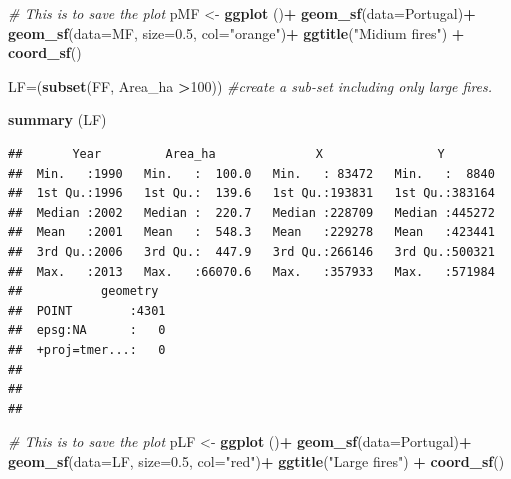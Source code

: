 \documentclass[
]{article}
\newenvironment{Shaded}{\begin{snugshade}}{\end{snugshade}}
\newcommand{\AttributeTok}[1]{\textcolor[rgb]{0.13,0.29,0.53}{#1}}
\newcommand{\CommentTok}[1]{\textcolor[rgb]{0.56,0.35,0.01}{\textit{#1}}}
\newcommand{\DecValTok}[1]{\textcolor[rgb]{0.00,0.00,0.81}{#1}}
\newcommand{\FloatTok}[1]{\textcolor[rgb]{0.00,0.00,0.81}{#1}}
\newcommand{\FunctionTok}[1]{\textcolor[rgb]{0.13,0.29,0.53}{\textbf{#1}}}
\newcommand{\NormalTok}[1]{#1}
\newcommand{\OtherTok}[1]{\textcolor[rgb]{0.56,0.35,0.01}{#1}}
\newcommand{\SpecialCharTok}[1]{\textcolor[rgb]{0.81,0.36,0.00}{\textbf{#1}}}
\newcommand{\StringTok}[1]{\textcolor[rgb]{0.31,0.60,0.02}{#1}}
\begin{document}
\begin{Shaded}
\begin{Highlighting}[]
\CommentTok{\# This is to save the plot }
\NormalTok{pMF }\OtherTok{\textless{}{-}} \FunctionTok{ggplot}\NormalTok{ ()}\SpecialCharTok{+}
  \FunctionTok{geom\_sf}\NormalTok{(}\AttributeTok{data=}\NormalTok{Portugal)}\SpecialCharTok{+}
  \FunctionTok{geom\_sf}\NormalTok{(}\AttributeTok{data=}\NormalTok{MF, }\AttributeTok{size=}\FloatTok{0.5}\NormalTok{, }\AttributeTok{col=}\StringTok{"orange"}\NormalTok{)}\SpecialCharTok{+}
 \FunctionTok{ggtitle}\NormalTok{(}\StringTok{"Midium fires"}\NormalTok{) }\SpecialCharTok{+}
 \FunctionTok{coord\_sf}\NormalTok{()}
\end{Highlighting}
\end{Shaded}

\begin{Shaded}
\begin{Highlighting}[]
\NormalTok{LF}\OtherTok{=}\NormalTok{(}\FunctionTok{subset}\NormalTok{(FF, Area\_ha }\SpecialCharTok{\textgreater{}}\DecValTok{100}\NormalTok{)) }\CommentTok{\#create a sub{-}set including only large fires.}

\FunctionTok{summary}\NormalTok{ (LF)}
\end{Highlighting}
\end{Shaded}

\begin{verbatim}
##       Year         Area_ha              X                Y         
##  Min.   :1990   Min.   :  100.0   Min.   : 83472   Min.   :  8840  
##  1st Qu.:1996   1st Qu.:  139.6   1st Qu.:193831   1st Qu.:383164  
##  Median :2002   Median :  220.7   Median :228709   Median :445272  
##  Mean   :2001   Mean   :  548.3   Mean   :229278   Mean   :423441  
##  3rd Qu.:2006   3rd Qu.:  447.9   3rd Qu.:266146   3rd Qu.:500321  
##  Max.   :2013   Max.   :66070.6   Max.   :357933   Max.   :571984  
##           geometry   
##  POINT        :4301  
##  epsg:NA      :   0  
##  +proj=tmer...:   0  
##                      
##                      
## 
\end{verbatim}

\begin{Shaded}
\begin{Highlighting}[]
\CommentTok{\# This is to save the plot }
\NormalTok{pLF }\OtherTok{\textless{}{-}} \FunctionTok{ggplot}\NormalTok{ ()}\SpecialCharTok{+}
  \FunctionTok{geom\_sf}\NormalTok{(}\AttributeTok{data=}\NormalTok{Portugal)}\SpecialCharTok{+}
  \FunctionTok{geom\_sf}\NormalTok{(}\AttributeTok{data=}\NormalTok{LF, }\AttributeTok{size=}\FloatTok{0.5}\NormalTok{, }\AttributeTok{col=}\StringTok{"red"}\NormalTok{)}\SpecialCharTok{+}
 \FunctionTok{ggtitle}\NormalTok{(}\StringTok{"Large fires"}\NormalTok{) }\SpecialCharTok{+}
 \FunctionTok{coord\_sf}\NormalTok{()}
\end{Highlighting}
\end{Shaded}
\end{document}
